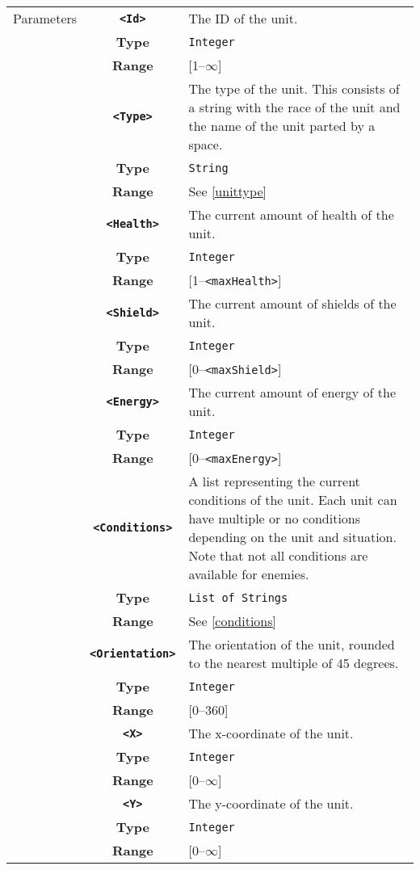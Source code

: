  \begin{tabularx}{\textwidth}{l | c | p{8cm}|}
 \cline{2-3}
 Parameters & \textbf{\verb|<Id>|} & The ID of the unit.\\
            & \textbf{Type} & \verb|Integer| \\
            & \textbf{Range} & [1--$\infty$] \\
            \cline{2-3}
            & \textbf{\verb|<Type>|} & The type of the unit. This consists of a string with the race of the unit and the name of the unit parted by a space. \\
            & \textbf{Type} & \verb|String| \\
            & \textbf{Range} & See \ref{unittype} \\
            \cline{2-3}
            & \textbf{\verb|<Health>|} & The current amount of health of the unit.\\
            & \textbf{Type} & \verb|Integer| \\
            & \textbf{Range} & [1--\verb|<maxHealth>|] \\
            \cline{2-3}
            & \textbf{\verb|<Shield>|} & The current amount of shields of the unit. \\
            & \textbf{Type} & \verb|Integer| \\
            & \textbf{Range} & [0--\verb|<maxShield>|] \\
            \cline{2-3}
            & \textbf{\verb|<Energy>|} & The current amount of energy of the unit. \\
            & \textbf{Type} & \verb|Integer| \\
            & \textbf{Range} & [0--\verb|<maxEnergy>|] \\
            \cline{2-3}
            & \textbf{\verb|<Conditions>|} & A list representing the current conditions of the unit. Each unit can have multiple or no conditions depending on the unit and situation. Note that not all conditions are available for enemies.\\
            & \textbf{Type} & \verb|List of Strings| \\
            & \textbf{Range} & See \ref{conditions} \\
            \cline{2-3}
            & \textbf{\verb|<Orientation>|} & The orientation of the unit, rounded to the nearest multiple of 45 degrees.\\
            & \textbf{Type} & \verb|Integer| \\
            & \textbf{Range} & [0--360] \\
            \cline{2-3}
            & \textbf{\verb|<X>|} & The x-coordinate of the unit.\\
            & \textbf{Type} & \verb|Integer| \\
            & \textbf{Range} & [0--$\infty$] \\
            \cline{2-3}
            & \textbf{\verb|<Y>|} & The y-coordinate of the unit.\\
            & \textbf{Type} & \verb|Integer| \\
            & \textbf{Range} & [0--$\infty$] \\
            \cline{2-3}
\end{tabularx}
